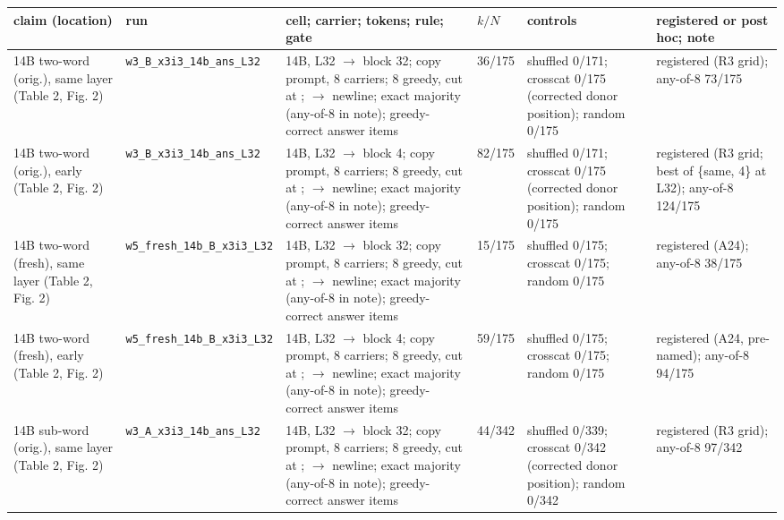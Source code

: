 \begin{table}[t]
\centering
\small
\setlength{\tabcolsep}{1mm}
\begin{tabular}{@{}p{2.5cm}p{2.3cm}p{4.5cm}p{1.3cm}p{3.0cm}p{2.9cm}@{}}
\toprule
claim (location) & run & cell; carrier; tokens; rule; gate & $k/N$ & controls & registered or post hoc; note \\
\midrule
14B two-word (orig.), same layer (Table 2, Fig. 2) & \texttt{w3\_\allowbreak{{}}B\_\allowbreak{{}}x3i3\_\allowbreak{{}}14b\_\allowbreak{{}}ans\_\allowbreak{{}}L32} & 14B, L32 $\to$ block 32; copy prompt, 8 carriers; 8 greedy, cut at ; $\to$ newline; exact majority (any-of-8 in note); greedy-correct answer items & 36/175 & shuffled 0/171; crosscat 0/175 (corrected donor position); random 0/175 & registered (R3 grid); any-of-8 73/175 \\
14B two-word (orig.), early (Table 2, Fig. 2) & \texttt{w3\_\allowbreak{{}}B\_\allowbreak{{}}x3i3\_\allowbreak{{}}14b\_\allowbreak{{}}ans\_\allowbreak{{}}L32} & 14B, L32 $\to$ block 4; copy prompt, 8 carriers; 8 greedy, cut at ; $\to$ newline; exact majority (any-of-8 in note); greedy-correct answer items & 82/175 & shuffled 0/171; crosscat 0/175 (corrected donor position); random 0/175 & registered (R3 grid; best of \{same, 4\} at L32); any-of-8 124/175 \\
14B two-word (fresh), same layer (Table 2, Fig. 2) & \texttt{w5\_\allowbreak{{}}fresh\_\allowbreak{{}}14b\_\allowbreak{{}}B\_\allowbreak{{}}x3i3\_\allowbreak{{}}L32} & 14B, L32 $\to$ block 32; copy prompt, 8 carriers; 8 greedy, cut at ; $\to$ newline; exact majority (any-of-8 in note); greedy-correct answer items & 15/175 & shuffled 0/175; crosscat 0/175; random 0/175 & registered (A24); any-of-8 38/175 \\
14B two-word (fresh), early (Table 2, Fig. 2) & \texttt{w5\_\allowbreak{{}}fresh\_\allowbreak{{}}14b\_\allowbreak{{}}B\_\allowbreak{{}}x3i3\_\allowbreak{{}}L32} & 14B, L32 $\to$ block 4; copy prompt, 8 carriers; 8 greedy, cut at ; $\to$ newline; exact majority (any-of-8 in note); greedy-correct answer items & 59/175 & shuffled 0/175; crosscat 0/175; random 0/175 & registered (A24, pre-named); any-of-8 94/175 \\
14B sub-word (orig.), same layer (Table 2, Fig. 2) & \texttt{w3\_\allowbreak{{}}A\_\allowbreak{{}}x3i3\_\allowbreak{{}}14b\_\allowbreak{{}}ans\_\allowbreak{{}}L32} & 14B, L32 $\to$ block 32; copy prompt, 8 carriers; 8 greedy, cut at ; $\to$ newline; exact majority (any-of-8 in note); greedy-correct answer items & 44/342 & shuffled 0/339; crosscat 0/342 (corrected donor position); random 0/342 & registered (R3 grid); any-of-8 97/342 \\

\end{tabular}
\end{table}

